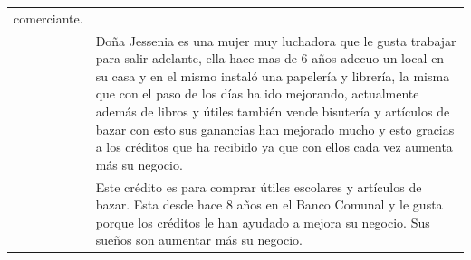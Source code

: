 \begin{longtable}{|p{}|p{}|}
	comerciante.                                                                                                                                                    \\
	                                                & Doña Jessenia es una mujer muy luchadora que le gusta trabajar para
	salir adelante, ella hace mas de 6 años adecuo un local en su casa y en
	el mismo instaló una papelería y librería, la misma que con el paso de
	los días ha ido mejorando, actualmente además de libros y útiles también
	vende bisutería y artículos de bazar con esto sus ganancias han mejorado
	mucho y esto gracias a los créditos que ha recibido ya que con ellos
	cada vez aumenta más su negocio.                                                                                                                                \\
	                                                & Este crédito es para comprar útiles escolares y artículos de bazar.
	Esta desde hace 8 años en el Banco Comunal y le gusta porque los
	créditos le han ayudado a mejora su negocio. Sus sueños son aumentar más
	su negocio.
\end{longtable}


